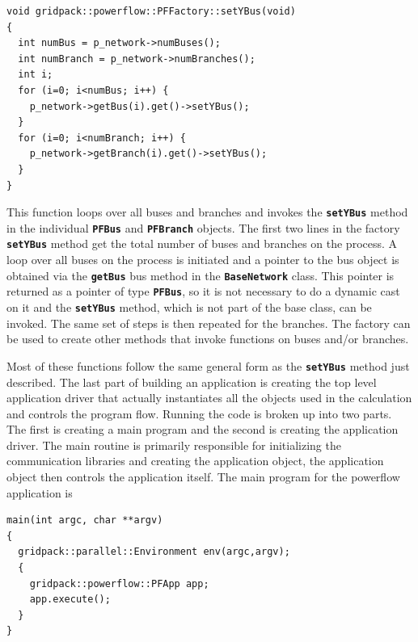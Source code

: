 {
\color{red}
\begin{Verbatim}[fontseries=b]
void gridpack::powerflow::PFFactory::setYBus(void)
{
  int numBus = p_network->numBuses();
  int numBranch = p_network->numBranches();
  int i;
  for (i=0; i<numBus; i++) {
    p_network->getBus(i).get()->setYBus();
  }
  for (i=0; i<numBranch; i++) {
    p_network->getBranch(i).get()->setYBus();
  }
}
\end{Verbatim}
}

This function loops over all buses and branches and invokes the \texttt{\textbf{setYBus}} method in the individual \texttt{\textbf{PFBus}} and \texttt{\textbf{PFBranch}} objects. The first two lines in the factory \texttt{\textbf{setYBus}} method get the total number of buses and branches on the process. A loop over all buses on the process is initiated and a pointer to the bus object is obtained via the \texttt{\textbf{getBus}} bus method in the \texttt{\textbf{BaseNetwork}} class. This pointer is returned as a pointer of type \texttt{\textbf{PFBus}}, so it is not necessary to do a dynamic cast on it and the \texttt{\textbf{setYBus}} method, which is not part of the base class, can be invoked. The same set of steps is then repeated for the branches. The factory can be used to create other methods that invoke functions on buses and/or branches. 

Most of these functions follow the same general form as the \texttt{\textbf{setYBus}} method just described.
The last part of building an application is creating the top level application driver that actually instantiates all the objects used in the calculation and controls the program flow. Running the code is broken up into two parts. The first is creating a main program and the second is creating the application driver. The main routine is primarily responsible for initializing the communication libraries and creating the application object, the application object then controls the application itself. The main program for the powerflow application is

{
\color{red}
\begin{Verbatim}[fontseries=b]
main(int argc, char **argv)
{
  gridpack::parallel::Environment env(argc,argv);
  {
    gridpack::powerflow::PFApp app;
    app.execute();
  }
}
\end{Verbatim}
}


